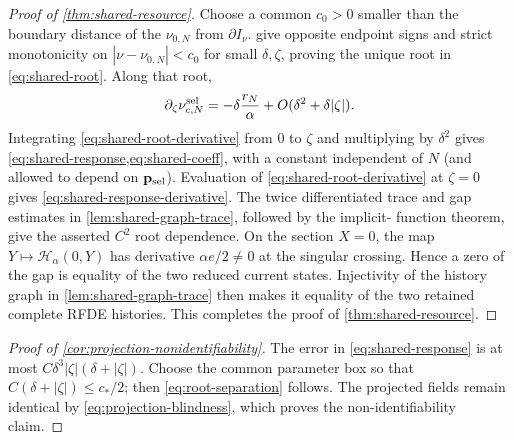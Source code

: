 \begin{proof}[Proof of \cref{thm:shared-resource}]
Choose a common \(c_0>0\) smaller than the boundary distance of the
\(\nu_{0,N}\) from \(\partial I_\nu\).
 give opposite endpoint
signs and strict monotonicity on
\(|\nu-\nu_{0,N}|<c_0\) for small \(\delta,\zeta\), proving the unique root
in \cref{eq:shared-root}.  Along that root,
\begin{equation}
 \partial_\zeta\nu^{\rm sel}_{c,N}
 =-\delta\frac{r_N}{\alpha}
       +O(\delta^2+\delta|\zeta|).                    \label{eq:shared-root-derivative}
\end{equation}
Integrating \cref{eq:shared-root-derivative} from \(0\) to \(\zeta\) and
multiplying by \(\delta^2\) gives
\cref{eq:shared-response,eq:shared-coeff}, with a constant independent of
\(N\) (and allowed to depend on \(\mathbf p_{\rm sel}\)).  Evaluation of
\cref{eq:shared-root-derivative} at \(\zeta=0\) gives
\cref{eq:shared-response-derivative}.  The twice differentiated trace and
gap estimates in \cref{lem:shared-graph-trace}, followed by the implicit-
function theorem, give the asserted \(C^2\) root dependence.  On the section
\(X=0\), the map
\(Y\mapsto\mathscr H_\alpha(0,Y)\) has derivative \(\alpha e/2\ne0\) at
the singular crossing.  Hence a zero of the gap is equality of the two
reduced current states.  Injectivity of the history graph in
\cref{lem:shared-graph-trace} then makes it equality of the two retained
complete RFDE histories.
This completes the proof of \cref{thm:shared-resource}.
\end{proof}

\begin{proof}[Proof of \cref{cor:projection-nonidentifiability}]
The error in \cref{eq:shared-response} is at most
\(C\delta^3|\zeta|(\delta+|\zeta|)\).  Choose the common parameter box so
that \(C(\delta+|\zeta|)\le c_*/2\); then
\cref{eq:root-separation} follows.  The projected fields remain identical by
\cref{eq:projection-blindness}, which proves the non-identifiability claim.
\end{proof}

